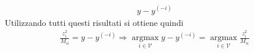\documentclass[11pt,largemargins]{homework}
\DeclareMathOperator*{\argmax}{argmax}
\DeclareMathOperator*{\argmin}{argmin}
\begin{document}
\begin{alphaparts}
\begin{gather*}
     \\ y - y^{(-i)}
  \end{gather*}
  Utilizzando tutti questi risultati si ottiene quindi
  \begin{gather*}
    \frac{z_i^2}{M_{ii}} =  y - y^{(-i)}  \Rightarrow \argmax \limits_{i \in \mathcal{V}} y - y^{(-i)} = \argmax \limits_{i \in \mathcal{V}}\frac{z_i^2}{M_{ii}}
  \end{gather*}
  


\end{alphaparts}
\end{document}
